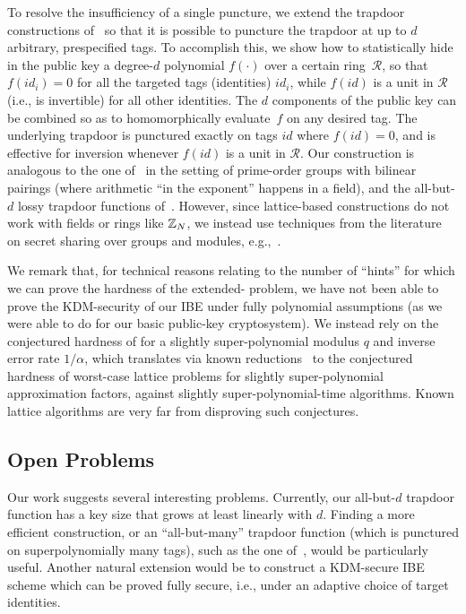 To resolve the insufficiency of a single puncture, we extend the
trapdoor constructions
of~\cite{DBLP:conf/eurocrypt/AgrawalBB10,DBLP:conf/eurocrypt/MicciancioP12}
so that it is possible to puncture the trapdoor at up to $d$
arbitrary, prespecified tags.  To accomplish this, we show how to
statistically hide in the public key a degree-$d$ polynomial
$f(\cdot)$ over a certain ring~$\mathcal{R}$, so that $f(id_{i})=0$
for all the targeted tags (identities) $id_{i}$, while $f(id)$ is a
unit in $\mathcal{R}$ (i.e., is invertible) for all other identities.
The $d$ components of the public key can be combined so as to
homomorphically evaluate~$f$ on any desired tag.  The underlying
trapdoor is punctured exactly on tags $id$ where $f(id)=0$, and is
effective for inversion whenever $f(id)$ is a unit in $\mathcal{R}$.
Our construction is analogous to the one
of~\cite{DBLP:conf/pkc/ChatterjeeS06} in the setting of prime-order
groups with bilinear pairings (where arithmetic ``in the exponent''
happens in a field), and the all-but-$d$ lossy trapdoor functions
of~\cite{DBLP:conf/asiacrypt/HemenwayLOV11}.  However, since
lattice-based constructions do not work with fields or rings like
$\mathbb{Z}_{N}$, we instead use techniques from the literature on secret
sharing over groups and modules,
e.g.,~\cite{DBLP:journals/siamdm/DesmedtF94,Fehr98}.

We remark that, for technical reasons relating to the number of
``hints'' for which we can prove the hardness of the extended-\lwe
problem, we have not been able to prove the KDM-security of our IBE
under fully polynomial assumptions (as we were able to do for our
basic public-key cryptosystem).  We instead rely on the conjectured
hardness of \lwe for a slightly super-polynomial modulus $q$ and
inverse error rate $1/\alpha$, which translates via known
reductions~\cite{DBLP:journals/jacm/Regev09,DBLP:conf/stoc/Peikert09}
to the conjectured hardness of worst-case lattice problems for
slightly super-polynomial approximation factors, against slightly
super-polynomial-time algorithms.  Known lattice algorithms are very
far from disproving such conjectures.

\subsection{Open Problems}
\label{sec:open-probs}

Our work suggests several interesting problems.  Currently, our
all-but-$d$ trapdoor function has a key size that grows at least
linearly with $d$.  Finding a more efficient construction, or an
``all-but-many'' trapdoor function (which is punctured on
superpolynomially many tags), such as the one
of~\cite{DBLP:conf/eurocrypt/Hofheinz12}, would be particularly
useful.  Another natural extension would be to construct a KDM-secure
IBE scheme which can be proved fully secure, i.e., under an adaptive
choice of target identities.

